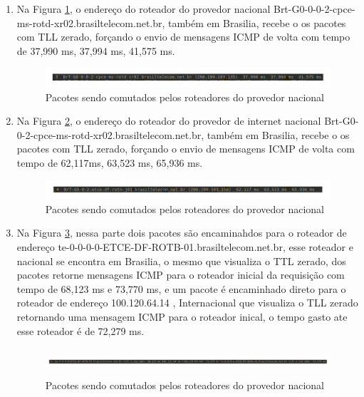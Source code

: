 \documentclass[
	article,			%
	11pt,				%
	oneside,			%
	a4paper,			%
	english,			%
	brazil,				%
	sumario=tradicional
	]{abntex2}
\begin{document}
\begin{enumerate}
	 \item Na Figura \ref{rota-4}, o endereço do roteador do provedor nacional Brt-G0-0-0-2-cpce-ms-rotd-xr02.brasiltelecom.net.br, também em Brasilia, recebe o os pacotes com TLL zerado, forçando o envio de mensagens ICMP de volta com tempo de 37,990 ms, 37,994 ms, 41,575 ms. 
	 
	 \begin{figure}[h]
	 	\centering
	 	\includegraphics[scale=0.54]{./rota-4.png}
	 	\caption{Pacotes sendo comutados pelos roteadores do provedor nacional}
	 	\label{rota-4}
	 \end{figure}
 
	\item
	 Na Figura \ref{rota-5}, o endereço do roteador do provedor de internet nacional Brt-G0-0-2-cpce-ms-rotd-xr02.brasiltelecom.net.br, também em Brasilia, recebe o os pacotes com TLL zerado, forçando o envio de mensagens ICMP de volta com tempo de 62,117ms, 63,523 ms, 65,936 ms. 
	
	\begin{figure}[h]
		\centering
		\includegraphics[scale=0.54]{./rota-5.png}
		\caption{Pacotes sendo comutados pelos roteadores do provedor nacional}
		\label{rota-5}
	\end{figure}

	\item 
	Na Figura \ref{rota-6}, nessa parte dois pacotes são encaminahdos para o roteador de endereço te-0-0-0-0-ETCE-DF-ROTB-01.brasiltelecom.net.br, esse roteador e nacional se encontra em Brasilia, o mesmo que visualiza o TTL zerado, dos pacotes retorne mensagens ICMP para o roteador inicial da requisição com tempo de 68,123 ms e 73,770 ms, e um pacote é encaminhado direto para o roteador de endereço 100.120.64.14 , Internacional que visualiza o TLL zerado retornando uma mensagem ICMP para o roteador inical, o tempo gasto ate esse roteador é de 72,279 ms.
	
	\begin{figure}[h]
		\centering
		\includegraphics[width=17cm,height=1cm]{./rota-6.png}
		\caption{Pacotes sendo comutados pelos roteadores do provedor nacional}
		\label{rota-6}
	\end{figure}


\end{enumerate}
\end{document}

